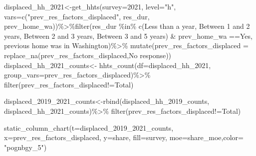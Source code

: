 \documentclass[
]{article}
\newenvironment{Shaded}{\begin{snugshade}}{\end{snugshade}}
\newcommand{\AttributeTok}[1]{\textcolor[rgb]{0.77,0.63,0.00}{#1}}
\newcommand{\FunctionTok}[1]{\textcolor[rgb]{0.00,0.00,0.00}{#1}}
\newcommand{\NormalTok}[1]{#1}
\newcommand{\OtherTok}[1]{\textcolor[rgb]{0.56,0.35,0.01}{#1}}
\newcommand{\SpecialCharTok}[1]{\textcolor[rgb]{0.00,0.00,0.00}{#1}}
\newcommand{\StringTok}[1]{\textcolor[rgb]{0.31,0.60,0.02}{#1}}
\begin{document}
\begin{Shaded}
\begin{Highlighting}[]
\NormalTok{displaced\_hh\_2021}\OtherTok{\textless{}{-}}\FunctionTok{get\_hhts}\NormalTok{(}\AttributeTok{survey=}\StringTok{\textquotesingle{}2021\textquotesingle{}}\NormalTok{, }\AttributeTok{level=}\StringTok{"h"}\NormalTok{, }\AttributeTok{vars=}\FunctionTok{c}\NormalTok{(}\StringTok{"prev\_res\_factors\_displaced"}\NormalTok{, }\StringTok{\textquotesingle{}res\_dur\textquotesingle{}}\NormalTok{, }\StringTok{\textquotesingle{}prev\_home\_wa\textquotesingle{}}\NormalTok{))}\SpecialCharTok{\%\textgreater{}\%}\FunctionTok{filter}\NormalTok{(res\_dur }\SpecialCharTok{\%in\%} \FunctionTok{c}\NormalTok{(}\StringTok{\textquotesingle{}Less than a year\textquotesingle{}}\NormalTok{, }\StringTok{\textquotesingle{}    Between 1 and 2 years\textquotesingle{}}\NormalTok{, }\StringTok{\textquotesingle{}Between 2 and 3 years\textquotesingle{}}\NormalTok{,    }\StringTok{\textquotesingle{}Between 3 and 5 years\textquotesingle{}}\NormalTok{) }\SpecialCharTok{\&}\NormalTok{ prev\_home\_wa }\SpecialCharTok{==}\StringTok{\textquotesingle{}Yes, previous home was in Washington\textquotesingle{}}\NormalTok{)}\SpecialCharTok{\%\textgreater{}\%} \FunctionTok{mutate}\NormalTok{(}\AttributeTok{prev\_res\_factors\_displaced =} \FunctionTok{replace\_na}\NormalTok{(prev\_res\_factors\_displaced,}\StringTok{\textquotesingle{}No response\textquotesingle{}}\NormalTok{))}
\NormalTok{displaced\_hh\_2021\_counts}\OtherTok{\textless{}{-}} \FunctionTok{hhts\_count}\NormalTok{(}\AttributeTok{df=}\NormalTok{displaced\_hh\_2021, }\AttributeTok{group\_vars=}\StringTok{\textquotesingle{}prev\_res\_factors\_displaced\textquotesingle{}}\NormalTok{)}\SpecialCharTok{\%\textgreater{}\%}
\FunctionTok{filter}\NormalTok{(prev\_res\_factors\_displaced}\SpecialCharTok{!=}\StringTok{\textquotesingle{}Total\textquotesingle{}}\NormalTok{)}

\NormalTok{displaced\_2019\_2021\_counts}\OtherTok{\textless{}{-}}\FunctionTok{rbind}\NormalTok{(displaced\_hh\_2019\_counts, displaced\_hh\_2021\_counts)}\SpecialCharTok{\%\textgreater{}\%}
\FunctionTok{filter}\NormalTok{(prev\_res\_factors\_displaced}\SpecialCharTok{!=}\StringTok{\textquotesingle{}Total\textquotesingle{}}\NormalTok{)}

\FunctionTok{static\_column\_chart}\NormalTok{(}\AttributeTok{t=}\NormalTok{displaced\_2019\_2021\_counts, }\AttributeTok{x=}\StringTok{\textquotesingle{}prev\_res\_factors\_displaced\textquotesingle{}}\NormalTok{, }\AttributeTok{y=}\StringTok{\textquotesingle{}share\textquotesingle{}}\NormalTok{, }\AttributeTok{fill=}\StringTok{\textquotesingle{}survey\textquotesingle{}}\NormalTok{, }\AttributeTok{moe=}\StringTok{\textquotesingle{}share\_moe\textquotesingle{}}\NormalTok{,}\AttributeTok{color=}  \StringTok{"pognbgy\_5"}\NormalTok{)}
\end{Highlighting}
\end{Shaded}
\end{document}

